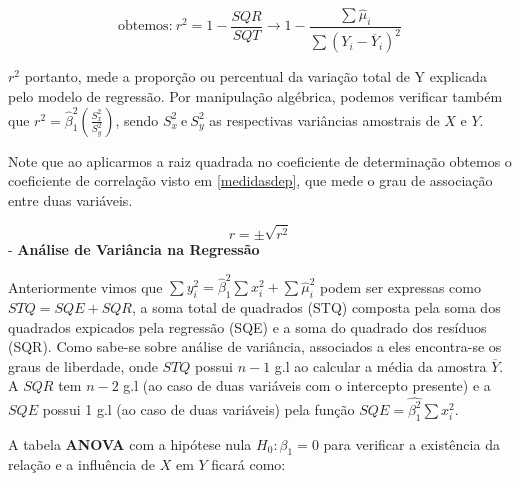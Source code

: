 \documentclass[
]{book}
\begin{document}
\begin{equation}
    \mbox{obtemos:} \ r^2=1-\frac{SQR}{SQT} \rightarrow 1 - \frac{\sum \hat{\mu}_i}{\sum (Y_i - \overline{Y}_i)^2}
    \label{eq:coefdet}
\end{equation}

\(r^2\) portanto, mede a proporção ou percentual da variação total de Y explicada pelo modelo de regressão. Por manipulação algébrica, podemos verificar também que \(r^2=\hat{\beta}^2_1(\frac{S^2_x}{S^2_y})\), sendo \(S^2_x\ \mbox{e} \ S^2_y\) as respectivas variâncias amostrais de \(X\) e \(Y\).

Note que ao aplicarmos a raiz quadrada no coeficiente de determinação obtemos o coeficiente de correlação visto em \ref{medidasdep}, que mede o grau de associação entre duas variáveis.

\[r=\pm \sqrt{r^2}\]
- \textbf{Análise de Variância na Regressão}

Anteriormente vimos que \(\sum y^2_i=\hat{\beta}^2_1 \sum x_i^2+\sum \hat{\mu}^2_i\) podem ser expressas como \(STQ=SQE+SQR\), a soma total de quadrados (STQ) composta pela soma dos quadrados expicados pela regressão (SQE) e a soma do quadrado dos resíduos (SQR). Como sabe-se sobre análise de variância, associados a eles encontra-se os graus de liberdade, onde \(STQ\) possui \(n-1\) g.l ao calcular a média da amostra \(\overline{Y}\). A \(SQR\) tem \(n-2\) g.l (ao caso de duas variáveis com o intercepto presente) e a \(SQE\) possui 1 g.l (ao caso de duas variáveis) pela função \(SQE=\hat{\beta_1^2}\sum x^2_i\).

A tabela \textbf{ANOVA} com a hipótese nula \(H_0: \beta_1=0\) para verificar a existência da relação e a influência de \(X\) em \(Y\) ficará como:
\end{document}

